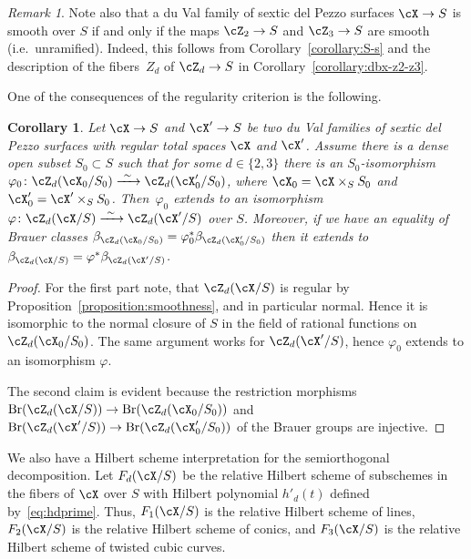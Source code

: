 \documentclass[11pt]{amsart}
\DeclareMathOperator{\Br}{\mathrm{Br}}
\theoremstyle{plain}
\newtheorem{corollary}[theorem]{Corollary}
\theoremstyle{definition}
\theoremstyle{remark}
\newtheorem{remark}[theorem]{Remark}
\begin{document}
\begin{remark}
\label{remark:smoothness}
Note also that a du Val family of sextic del Pezzo surfaces $\cX \to S$ is smooth over $S$ 
if and only if the maps $\cZ_2 \to S$ and $\cZ_3 \to S$ are smooth (i.e.\ unramified).
Indeed, this follows from Corollary~\ref{corollary:S-s} 
and the description of the fibers~$Z_d$ of $\cZ_d \to S$ in Corollary~\ref{corollary:dbx-z2-z3}.
\end{remark}

One of the consequences of the regularity criterion is the following.

\begin{corollary}\label{corollary:birational-isomorphism-zd}
Let $\cX \to S$ and $\cX' \to S$ be two du Val families of sextic del Pezzo surfaces with regular total spaces $\cX$ and $\cX'$.
Assume there is a dense open subset $S_0 \subset S$ such that for some $d \in \{2,3\}$ there is 
an $S_0$-isomorphism $\varphi_0 \colon \cZ_d(\cX_0/S_0) \xrightarrow{\ \sim\ }\cZ_d(\cX'_0/S_0)$, where $\cX_0 = \cX \times_S S_0$ and~$\cX'_0 = \cX' \times_S S_0$.
Then~$\varphi_0$ extends to an isomorphism $\varphi \colon \cZ_d(\cX/S) \xrightarrow{\ \sim\ } \cZ_d(\cX'/S)$ over $S$.
Moreover, if we have an equality of Brauer classes $\beta_{\cZ_d(\cX_0/S_0)} = \varphi_0^*\beta_{\cZ_d(\cX'_0/S_0)}$ then it extends to $\beta_{\cZ_d(\cX/S)} = \varphi^*\beta_{\cZ_d(\cX'/S)}$.
\end{corollary}
\begin{proof}
For the first part note, that $\cZ_d(\cX/S)$ is regular by Proposition~\ref{proposition:smoothness}, and in particular normal.
Hence it is isomorphic to the normal closure of $S$ in the field of rational functions on $\cZ_d(\cX_0/S_0)$.
The same argument works for $\cZ_d(\cX'/S)$, hence $\varphi_0$ extends to an isomorphism $\varphi$.

The second claim is evident because the restriction morphisms $\Br(\cZ_d(\cX/S)) \to  \Br(\cZ_d(\cX_0/S_0))$ and~$\Br(\cZ_d(\cX'/S)) \to  \Br(\cZ_d(\cX'_0/S_0))$ 
of the Brauer groups are injective.
\end{proof}


We also have a Hilbert scheme interpretation for the semiorthogonal decomposition.
Let $F_d(\cX/S)$ be the relative Hilbert scheme of subschemes in the fibers of $\cX$ over $S$ with Hilbert polynomial $h'_d(t)$ defined by~\eqref{eq:hdprime}.
Thus, $F_1(\cX/S)$ is the relative Hilbert scheme of lines, $F_2(\cX/S)$ is the relative Hilbert scheme of conics, and $F_3(\cX/S)$ is the relative Hilbert scheme of twisted cubic curves.
\end{document}
